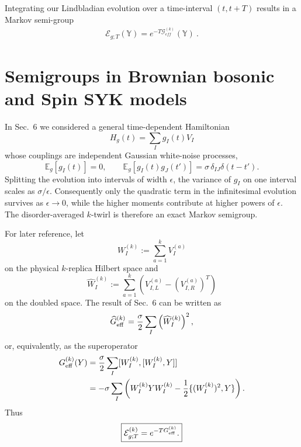 \documentclass{article}
\theoremstyle{definition}
\begin{document}
    Integrating our Lindbladian evolution over a time-interval $(t,t+T)$ results
    in a Markov semi-group
    \begin{eqnarray}
        \mathcal{E}_{g;T}(\mathbb{Y})=e^{-T\mathcal{G}_{eff}^{(k)}}(\mathbb{Y})\ .
    \end{eqnarray}

 

    \section{Semigroups in Brownian bosonic and Spin SYK models}
\label{sec:brownian_spin_syk}

In Sec.~6 we considered a general time-dependent Hamiltonian
\begin{equation}
    H_g(t)=\sum_I g_I(t)V_I
\end{equation}
whose couplings are independent Gaussian white-noise processes,
\begin{equation}
    \mathbb E_g[g_I(t)]=0,
    \qquad
    \mathbb E_g[g_I(t)g_J(t')]
    =
    \sigma\,\delta_{IJ}\delta(t-t').
    \label{eq:spinbrown_white_noise}
\end{equation}
Splitting the evolution into intervals of width $\epsilon$, the variance of
$g_I$ on one interval scales as $\sigma/\epsilon$.  Consequently only the
quadratic term in the infinitesimal evolution survives as
$\epsilon\rightarrow0$, while the higher moments contribute at higher powers
of $\epsilon$.  The disorder-averaged $k$-twirl is therefore an exact Markov
semigroup.

For later reference, let
\begin{equation}
    W_I^{(k)}
    :=
    \sum_{a=1}^kV_I^{(a)}
\end{equation}
on the physical $k$-replica Hilbert space and
\begin{equation}
    \widehat W_I^{(k)}
    :=
    \sum_{a=1}^k
    \left(
        V_{I,L}^{(a)}
        -
        (V_{I,R}^{(a)})^T
    \right)
\end{equation}
on the doubled space.  The result of Sec.~6 can be written as
\begin{equation}
    \widehat G_{\rm eff}^{(k)}
    =
    \frac{\sigma}{2}
    \sum_I
    \left(
        \widehat W_I^{(k)}
    \right)^2,
    \label{eq:spinbrown_Ghat_general}
\end{equation}
or, equivalently, as the superoperator
\begin{align}
    G_{\rm eff}^{(k)}(Y)
    &=
    \frac{\sigma}{2}
    \sum_I
    [W_I^{(k)},[W_I^{(k)},Y]]
    \nonumber\\
    &=
    -\sigma
    \sum_I
    \left(
       W_I^{(k)}YW_I^{(k)}
       -
       \frac12
       \{
          (W_I^{(k)})^2,Y
       \}
    \right).
    \label{eq:spinbrown_G_general}
\end{align}
Thus
\begin{equation}
    \boxed{
    {\cal E}_{g;T}^{(k)}
    =
    e^{-T G_{\rm eff}^{(k)}} .
    }
    \label{eq:spinbrown_semigroup_general}
\end{equation}
\end{document}
